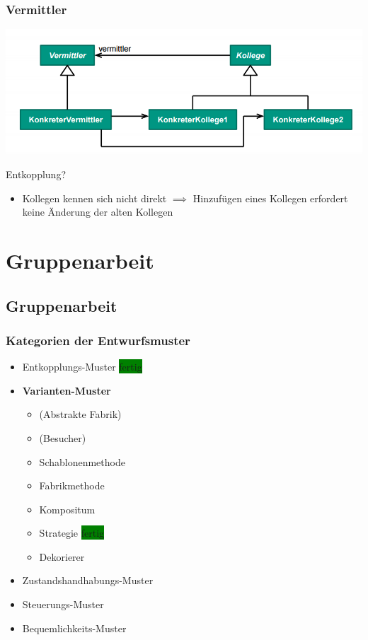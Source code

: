 \documentclass[18pt]{beamer}
\begin{document}
	\begin{frame}
		\frametitle{Vermittler}
		\centering
		\includegraphics[scale=0.45]{./pics/tut3/med.png}
		\begin{block}{Entkopplung?}
			\begin{itemize}
				\pause 
				\item Kollegen kennen sich nicht direkt  \linebreak \pause $\implies$ Hinzufügen eines Kollegen erfordert keine Änderung der alten Kollegen
			\end{itemize}
		\end{block}
	\end{frame}

\section{Gruppenarbeit}
\subsection{Gruppenarbeit}
	\begin{frame}
		\frametitle{Kategorien der Entwurfsmuster}
		\begin{itemize}
			\item Entkopplungs-Muster \colorbox{green}{fertig}
			\item \textbf{Varianten-Muster}
			\begin{itemize}
				\item (Abstrakte Fabrik)
				\item (Besucher)
				\item Schablonenmethode
				\item Fabrikmethode
				\item Kompositum
				\item Strategie \colorbox{green}{fertig}
				\item Dekorierer
			\end{itemize}
			\item Zustandshandhabungs-Muster
			\item Steuerungs-Muster
			\item Bequemlichkeits-Muster
		\end{itemize}
	\end{frame}
	
\end{document}
